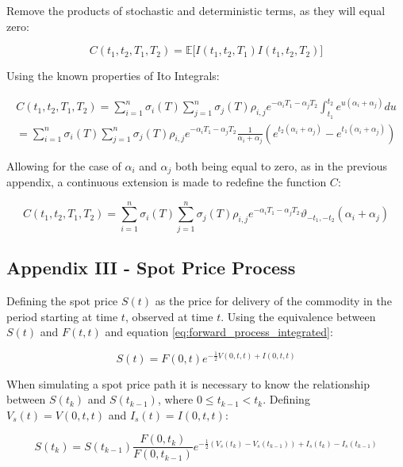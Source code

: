 \documentclass{article}
\begin{document}
Remove the products of stochastic and deterministic terms, as they will equal zero:

\begin{equation}
    C(t_1, t_2, T_1, T_2) = \mathbb{E}\bigl[ I(t_1, t_2, T_1) I(t_1, t_2, T_2) \bigr] 
\end{equation}

Using the known properties of Ito Integrals:

\begin{eqnarray}
    \nonumber
    C(t_1, t_2, T_1, T_2) = \sum_{i=1}^n \sigma_i(T) \sum_{j=1}^n 
    \sigma_j(T) \rho_{i,j} e^{-\alpha_i T_1 -\alpha_j T_2} 
    \int_{t_1}^{t_2} e^{u(\alpha_i + \alpha_j)} du \\
    = \sum_{i=1}^n \sigma_i(T) \sum_{j=1}^n \sigma_j(T) \rho_{i,j} 
    e^{-\alpha_i T_1 -\alpha_j T_2} \frac{1}{\alpha_i + \alpha_j}
    (e^{t_2(\alpha_i + \alpha_j)} - e^{t_1(\alpha_i + \alpha_j)} )
\end{eqnarray}

Allowing for the case of $\alpha_i$ and $\alpha_j$ both being equal to zero, 
as in the previous appendix, a continuous extension is made to redefine the function
$C$:

\begin{equation}
    C(t_1, t_2, T_1, T_2) = \sum_{i=1}^n \sigma_i(T) \sum_{j=1}^n \sigma_j(T) \rho_{i,j} 
    e^{-\alpha_i T_1 -\alpha_j T_2} \vartheta_{-t_1, -t_2}(\alpha_i + \alpha_j)
\end{equation}


\subsection{Appendix III - Spot Price Process}
Defining the spot price $S(t)$ as the price for delivery of the commodity in the period
starting at time $t$, observed at time $t$. Using the equivalence between $S(t)$
and $F(t, t)$ and equation \ref{eq:forward_process_integrated}:

\begin{equation}
    S(t) = F(0, t)e^{- \frac{1}{2} V(0, t, t) + I(0, t, t)}
\end{equation}

When simulating a spot price path it is necessary to know the relationship between
$S(t_k)$ and $S(t_{k-1})$, where $0 \leq t_{k-1} < t_k$. Defining $V_s(t)=V(0, t, t)$ and 
$I_s(t)=I(0, t, t)$:

\begin{equation}
    S(t_k) = S(t_{k-1}) \frac{F(0, t_k)}{F(0, t_{k-1})} e^{- \frac{1}{2} (V_s(t_k) - 
    V_s(t_{k-1})) + I_s(t_k) - I_s(t_{k-1})}
\end{equation}
\end{document}

